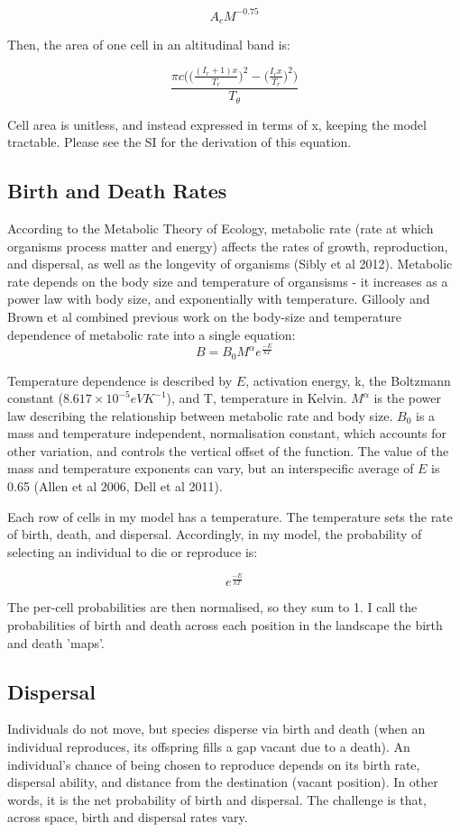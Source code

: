 \documentclass[11pt]{article}
\begin{document}
$$A_c M^{-0.75}$$

Then, the area of one cell in an altitudinal band is:  

$$\frac{\pi c \bigg(\Big(\frac{(I_r + 1)x}{T_r}\Big)^2 - \Big(\frac{I_r x}{T_r}\Big)^2 \bigg)}{T_\theta}$$

Cell area is unitless, and instead expressed in terms of x, keeping the model tractable. Please see the SI for the derivation of this equation.

\subsection*{Birth and Death Rates}
According to the Metabolic Theory of Ecology, metabolic rate (rate at which organisms process matter and energy) affects the rates of growth, reproduction, and dispersal, as well as the longevity of organisms \cite{2012Me:a} (Sibly et al 2012). Metabolic rate depends on the body size and temperature of organsisms - it increases as a power law with body size, and exponentially with temperature. Gillooly and Brown et al \cite{gillooly2001effects} combined previous work on the body-size and temperature dependence of metabolic rate into a single equation:
$$B = B_0 M^{\alpha} e^{\frac{-E}{kT}}$$

Temperature dependence is described by $E$, activation energy, k, the Boltzmann constant ($8.617 \times 10^{-5} eV K^{-1}$), and T, temperature in Kelvin. $M^{\alpha}$ is the power law describing the relationship between metabolic rate and body size. $B_0$ is a mass and temperature independent, normalisation constant, which accounts for other variation, and controls the vertical offset of the function. The value of the mass and temperature exponents can vary, but an interspecific average of $E$ is 0.65 \cite{allen2006kinetic, dell2011systematic} (Allen et al 2006, Dell et al 2011).

Each row of cells in my model has a temperature. The temperature sets the rate of birth, death, and dispersal. Accordingly, in my model, the probability of selecting an individual to die or reproduce is:

$$e^{\frac{-E}{kT}}$$

The per-cell probabilities are then normalised, so they sum to 1. I call the probabilities of birth and death across each position in the landscape the birth and death 'maps'.

\subsection*{Dispersal}
Individuals do not move, but species disperse via birth and death (when an individual reproduces, its offspring fills a gap vacant due to a death). An individual's chance of being chosen to reproduce depends on its birth rate, dispersal ability, and distance from the destination (vacant position). In other words, it is the net probability of birth and dispersal. The challenge is that, across space, birth and dispersal rates vary.
\end{document}
